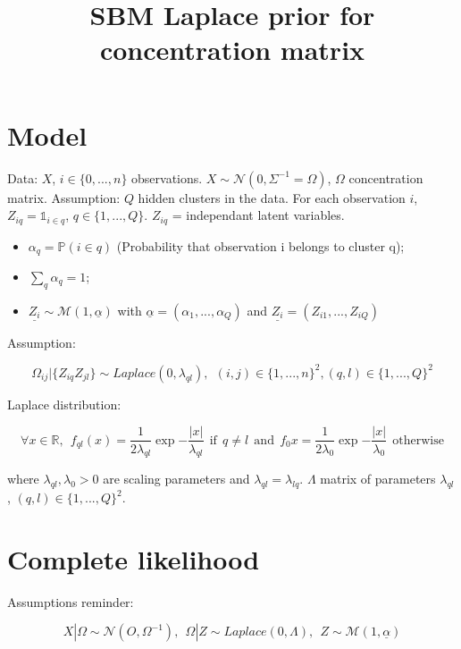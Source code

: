 \documentclass[10pt]{article}
\title{SBM Laplace prior for concentration matrix}
\begin{document}
\newcommand*{\norm}[1]{\left\lVert{#1}\right\rVert}

\maketitle

\section{Model}\label{sec:model}

Data: $X$, $i\in \{ 0,...,n \}$ observations. $X \sim \mathcal{N}(0, \Sigma^{-1} = \Omega)$, $\Omega$ concentration matrix. Assumption: $Q$ hidden clusters in the data. For each observation $i$, $Z_{iq} = \mathds{1}_{i\in q}$, $ q\in \{ 1,...,Q \}$. $Z_{iq}$ = independant latent variables.

\begin{itemize}
	\item $\alpha_q = \mathbb{P}(i\in q)$ (Probability that observation i belongs to cluster q); 
	\item $\sum_q \alpha_q = 1 $;
	\item $ \underline{Z_i} \sim \mathcal{M}(1, \underline{\alpha})$ with $\underline{\alpha} = (\alpha_1, ..., \alpha_Q)$  and $\underline{Z_i} = (Z_{i1}, ..., Z_{iQ})$
\end{itemize}

Assumption: 

\[ \Omega_{ij}| \{ Z_{iq}Z_{jl} \} \sim Laplace(0, \lambda_{ql}), ~~ (i,j) \in \{ 1,...,n \}^2, (q,l)\in \{ 1,...,Q \}^2 \]

Laplace distribution: 

\[ \forall x \in \mathbb{R},~~ 
f_{ql}(x) = \frac{1}{2\lambda_{ql}} \exp{-\frac{|x|}{\lambda_{ql}}} ~~ \text{if} ~~ q \neq l 
~~\text{and} ~~
f_0{x} = \frac{1}{2\lambda_{0}} \exp{-\frac{|x|}{\lambda_{0}}} ~~ \text{otherwise}\]

where $\lambda_{ql}, \lambda_0 > 0$ are scaling parameters and $\lambda_{ql} = \lambda_{lq}$. $\Lambda$ matrix of parameters $\lambda_{ql}$, $(q,l) \in \{1,...,Q\}^2$.



\section{Complete likelihood}

Assumptions reminder:

\[ X|\Omega \sim \mathcal{N}(O, \Omega^{-1}),~~ \Omega|Z \sim Laplace(0, \Lambda),~~ Z \sim \mathcal{M}(1,\underline{\alpha}) \]
\end{document}
